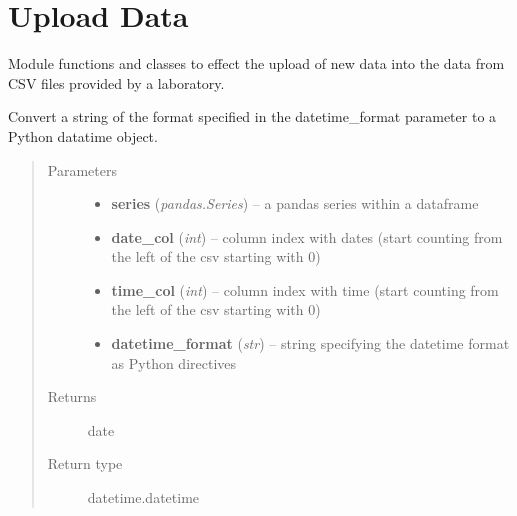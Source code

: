 \documentclass[letterpaper,10pt,english]{sphinxmanual}
\begin{document}
\section{Upload Data}
\label{modules:upload-data}
Module functions and classes to effect the upload
of new data into the data from CSV files provided
by a laboratory.

\begin{fulllineitems}
\label{modules:webb_utils.upload_data.string_to_datetime}
Convert a string of the format specified in the datetime\_format
parameter to a Python datatime object.
\begin{quote}\begin{description}
\item[{Parameters}] \leavevmode\begin{itemize}
\item {} 
\textbf{series} (\emph{pandas.Series}) -- a pandas series within a dataframe

\item {} 
\textbf{date\_col} (\emph{int}) -- column index with dates (start counting from the left of the csv starting with 0)

\item {} 
\textbf{time\_col} (\emph{int}) -- column index with time (start counting from the left of the csv starting with 0)

\item {} 
\textbf{datetime\_format} (\emph{str}) -- string specifying the datetime format as Python directives

\end{itemize}

\item[{Returns}] \leavevmode
date

\item[{Return type}] \leavevmode
datetime.datetime

\end{description}\end{quote}

\end{fulllineitems}

\end{document}
